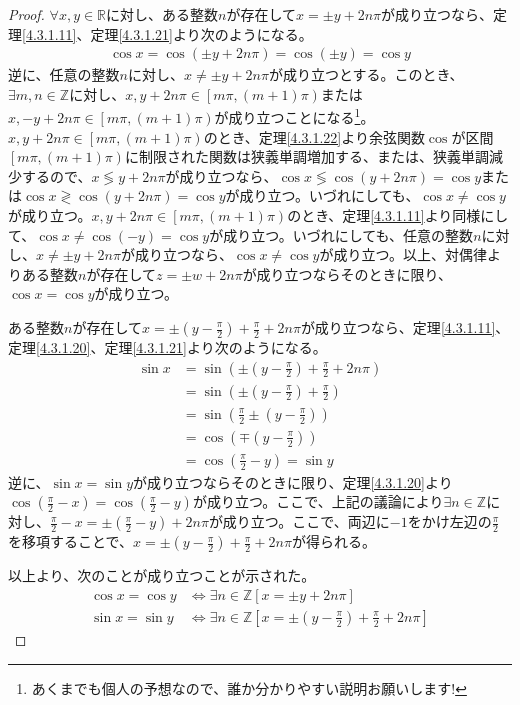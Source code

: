 \documentclass[dvipdfmx]{jsarticle}
\begin{document}
\begin{proof}
$\forall x,y \in \mathbb{R}$に対し、ある整数$n$が存在して$x = \pm y + 2n\pi$が成り立つなら、定理\ref{4.3.1.11}、定理\ref{4.3.1.21}より次のようになる。
\begin{align*}
\cos x = \cos( \pm y + 2n\pi) = \cos( \pm y) = \cos y
\end{align*}
逆に、任意の整数$n$に対し、$x \neq \pm y + 2n\pi$が成り立つとする。このとき、$\exists m,n \in \mathbb{Z}$に対し、$x,y + 2n\pi \in \left[ m\pi,(m + 1)\pi \right)$または$x, - y + 2n\pi \in \left[ m\pi,(m + 1)\pi \right)$が成り立つことになる\footnote{あくまでも個人の予想なので、誰か分かりやすい説明お願いします!}。$x,y + 2n\pi \in \left[ m\pi,(m + 1)\pi \right)$のとき、定理\ref{4.3.1.22}より余弦関数$\cos$が区間$\left[ m\pi,(m + 1)\pi \right)$に制限された関数は狭義単調増加する、または、狭義単調減少するので、$x \lessgtr y + 2n\pi$が成り立つなら、$\cos x \lessgtr \cos(y + 2n\pi) = \cos y$または$\cos x \gtrless \cos(y + 2n\pi) = \cos y$が成り立つ。いづれにしても、$\cos x \neq \cos y$が成り立つ。$x,y + 2n\pi \in \left[ m\pi,(m + 1)\pi \right)$のとき、定理\ref{4.3.1.11}より同様にして、$\cos x \neq \cos( - y) = \cos y$が成り立つ。いづれにしても、任意の整数$n$に対し、$x \neq \pm y + 2n\pi$が成り立つなら、$\cos x \neq \cos y$が成り立つ。以上、対偶律よりある整数$n$が存在して$z = \pm w + 2n\pi$が成り立つならそのときに限り、$\cos x = \cos y$が成り立つ。\par
ある整数$n$が存在して$x = \pm \left( y - \frac{\pi}{2} \right) + \frac{\pi}{2} + 2n\pi$が成り立つなら、定理\ref{4.3.1.11}、定理\ref{4.3.1.20}、定理\ref{4.3.1.21}より次のようになる。
\begin{align*}
\sin x &= \sin\left( \pm \left( y - \frac{\pi}{2} \right) + \frac{\pi}{2} + 2n\pi \right)\\
&= \sin\left( \pm \left( y - \frac{\pi}{2} \right) + \frac{\pi}{2} \right)\\
&= \sin\left( \frac{\pi}{2} \pm \left( y - \frac{\pi}{2} \right) \right)\\
&= \cos\left( \mp \left( y - \frac{\pi}{2} \right) \right)\\
&= \cos\left( \frac{\pi}{2} - y \right) = \sin y
\end{align*}
逆に、$\sin x = \sin y$が成り立つならそのときに限り、定理\ref{4.3.1.20}より$\cos\left( \frac{\pi}{2} - x \right) = \cos\left( \frac{\pi}{2} - y \right)$が成り立つ。ここで、上記の議論により$\exists n \in \mathbb{Z}$に対し、$\frac{\pi}{2} - x = \pm \left( \frac{\pi}{2} - y \right) + 2n\pi$が成り立つ。ここで、両辺に$- 1$をかけ左辺の$\frac{\pi}{2}$を移項することで、$x = \pm \left( y - \frac{\pi}{2} \right) + \frac{\pi}{2} + 2n\pi$が得られる。\par
以上より、次のことが成り立つことが示された。
\begin{align*}
\cos x = \cos y &\Leftrightarrow \exists n \in \mathbb{Z}[ x = \pm y + 2n\pi]\\
\sin x = \sin y &\Leftrightarrow \exists n \in \mathbb{Z}\left[ x = \pm \left( y - \frac{\pi}{2} \right) + \frac{\pi}{2} + 2n\pi \right]
\end{align*}
\end{proof}
\end{document}
